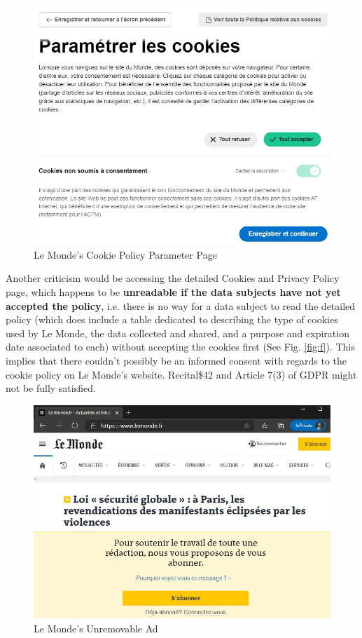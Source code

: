 \documentclass[twocolumn, letterpaper]{scrartcl}
\begin{document}
    	\begin{figure}[tbp]
            \includegraphics[width=0.9\linewidth]{lm_cn.JPG}
            \caption{Le Monde's Cookie Policy Parameter Page \label{fig:d}}
        \end{figure}
        
    	Another criticism would be accessing the detailed Cookies and Privacy Policy page\cite{LM2}, which happens to be \textbf{unreadable if the data subjects have not yet accepted the policy}, i.e. there is no way for a data subject to read the detailed policy (which does include a table dedicated to describing the type of cookies used by Le Monde, the data collected and shared, and a purpose and expiration date associated to each) without accepting the cookies first (See Fig. \ref{fig:f}). This implies that there couldn't possibly be an informed consent with regards to the cookie policy on Le Monde's website. Recital\$42 and Article 7(3) of GDPR might not be fully satisfied. 
        
        \begin{figure}[tbp]
            \includegraphics[width=0.95\linewidth]{lm_sub.JPG}
            \caption{Le Monde's Unremovable Ad \label{fig:e}}
        \end{figure}
        
\end{document}
